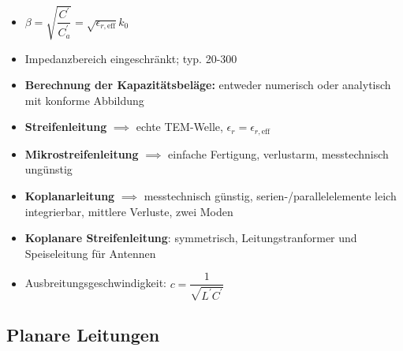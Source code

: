 {\begin{itemize}
     \item \(\beta = \sqrt{\dfrac{C^\prime}{C_a^\prime}} = \sqrt{\epsilon_{r,\mathrm{eff}}} k_0\)
     \item Impedanzbereich eingeschränkt; typ. \SI{20}{\Omega}-\SI{300}{\Omega}
     \item \textbf{Berechnung der Kapazitätsbeläge:} entweder numerisch oder analytisch mit konforme Abbildung
     \item \textbf{Streifenleitung} $\implies$ echte TEM-Welle, \(\epsilon_r = \epsilon_{r,\mathrm{eff}}\)
     \item \textbf{Mikrostreifenleitung} $\implies$ einfache Fertigung, verlustarm, messtechnisch ungünstig
     \item \textbf{Koplanarleitung} $\implies$ messtechnisch günstig, serien-/parallelelemente leich integrierbar, mittlere Verluste, zwei Moden
     \item \textbf{Koplanare Streifenleitung}: symmetrisch, Leitungstranformer und Speiseleitung für Antennen 
     \item Ausbreitungsgeschwindigkeit: \(c = \dfrac{1}{\sqrt{L^\prime C^\prime}}\)
 \end{itemize}
 \subsection{Planare Leitungen}
 }
